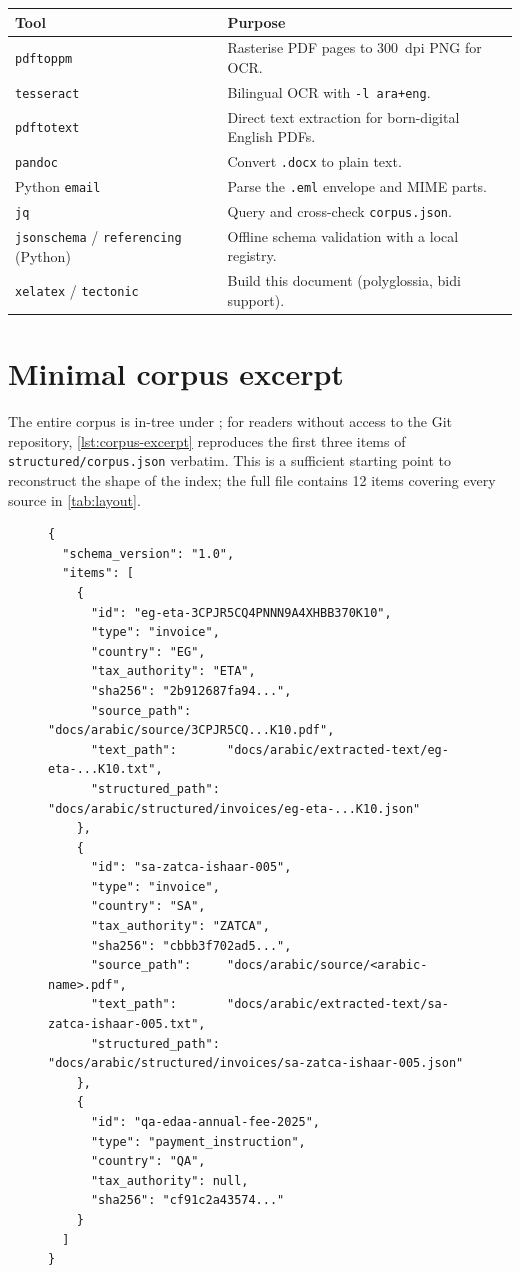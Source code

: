\begin{tabularx}{\linewidth}{@{}l X@{}}
\toprule
\textbf{Tool} & \textbf{Purpose} \\ \midrule
\texttt{pdftoppm}    & Rasterise PDF pages to 300~dpi PNG for OCR. \\
\texttt{tesseract}   & Bilingual OCR with \texttt{-l ara+eng}. \\
\texttt{pdftotext}   & Direct text extraction for born-digital English PDFs. \\
\texttt{pandoc}      & Convert \texttt{.docx} to plain text. \\
Python \texttt{email}& Parse the \texttt{.eml} envelope and MIME parts. \\
\texttt{jq}          & Query and cross-check \texttt{corpus.json}. \\
\texttt{jsonschema} / \texttt{referencing} (Python) & Offline schema validation with a local registry. \\
\texttt{xelatex} / \texttt{tectonic} & Build this document (polyglossia, bidi support). \\
\bottomrule
\end{tabularx}

\section{Minimal corpus excerpt}

The entire corpus is in-tree under \corpus; for readers without
access to the Git repository, \cref{lst:corpus-excerpt} reproduces
the first three items of \corpus\texttt{structured/corpus.json}
verbatim. This is a sufficient starting point to reconstruct the
shape of the index; the full file contains 12 items covering every
source in \cref{tab:layout}.

\begin{figure}[htbp]
\begin{lstlisting}[language=jsonx,caption={First three items of
\texttt{corpus.json}; identical SHA-256 values are reproduced in
\cref{ch:references}.},label=lst:corpus-excerpt]
{
  "schema_version": "1.0",
  "items": [
    {
      "id": "eg-eta-3CPJR5CQ4PNNN9A4XHBB370K10",
      "type": "invoice",
      "country": "EG",
      "tax_authority": "ETA",
      "sha256": "2b912687fa94...",
      "source_path":     "docs/arabic/source/3CPJR5CQ...K10.pdf",
      "text_path":       "docs/arabic/extracted-text/eg-eta-...K10.txt",
      "structured_path": "docs/arabic/structured/invoices/eg-eta-...K10.json"
    },
    {
      "id": "sa-zatca-ishaar-005",
      "type": "invoice",
      "country": "SA",
      "tax_authority": "ZATCA",
      "sha256": "cbbb3f702ad5...",
      "source_path":     "docs/arabic/source/<arabic-name>.pdf",
      "text_path":       "docs/arabic/extracted-text/sa-zatca-ishaar-005.txt",
      "structured_path": "docs/arabic/structured/invoices/sa-zatca-ishaar-005.json"
    },
    {
      "id": "qa-edaa-annual-fee-2025",
      "type": "payment_instruction",
      "country": "QA",
      "tax_authority": null,
      "sha256": "cf91c2a43574..."
    }
  ]
}
\end{lstlisting}
\end{figure}

